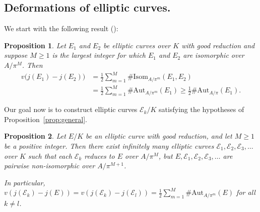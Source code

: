 \documentclass[11pt]{amsart}
\newtheorem{prop}{Proposition}[section]
\theoremstyle{definition}
\newcommand{\Aut} {\mathrm{Aut}}
\newcommand{\Isom} {\mathrm{Isom}}
\def\CE{\mathcal{E}}
\begin{document}
\subsection{Deformations of elliptic curves.}

We start with the following result (\cite[Prop. 2.3]{GZ1985}):

\begin{prop}\label{GZ}
	Let $E_1$ and $E_2$ be elliptic curves over $K$ with good reduction and suppose $M\geq 1$ is the largest integer for which $E_1$ and $E_2$ are isomorphic over $A/\pi^M$. Then
	\begin{align*}
		v\big(j(E_1)-j(E_2)\big) & = \frac{1}{2}\sum_{m=1}^M\#\Isom_{A/\pi^m}(E_1,E_2) \\
		& = \frac{1}{2}\sum_{m=1}^M\#\Aut_{A/\pi^m}(E_1) \geq \frac{1}{2}\#\Aut_{A/\pi}(E_1). 
	\end{align*}
\end{prop}

Our goal now is to construct elliptic curves $\CE_k/K$ satisfying the hypotheses of Proposition~\ref{prop:general}. 

\begin{prop}\label{LSTG}
	Let $E/K$ be an elliptic curve with good reduction, and let $M\geq 1$ be a positive integer. Then there exist infinitely many elliptic curves $\CE_1, \CE_2, \CE_3, \ldots$ over $K$ such that each $\CE_k$ reduces to $E$ over $A/\pi^M$, but $E, \CE_1, \CE_2, \CE_3, \ldots$ are pairwise non-isomorphic over $A/\pi^{M+1}$. 
	
	In particular, $v(j(\CE_k) - j(E)) = v(j(\CE_k) - j(\CE_l)) = \frac{1}{2}\sum_{m=1}^M\#\Aut_{A/\pi^m}(E)$ for all $k\neq l$.  
\end{prop}
\end{document}
